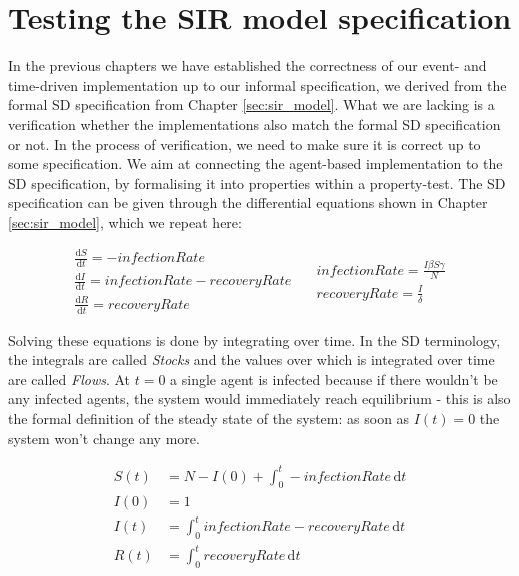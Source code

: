 \chapter{Testing the SIR model specification}
\label{ch:prop_sirspec}

In the previous chapters we have established the correctness of our event- and time-driven implementation up to our informal specification, we derived from the formal SD specification from Chapter \ref{sec:sir_model}. What we are lacking is a verification whether the implementations also match the formal SD specification or not. In the process of verification, we need to make sure it is correct up to some specification. We aim at connecting the agent-based implementation to the SD specification, by formalising it into properties within a property-test. The SD specification can be given through the differential equations shown in Chapter \ref{sec:sir_model}, which we repeat here:

\begin{equation}
\begin{split}
\frac{\mathrm d S}{\mathrm d t} = -infectionRate \\
\frac{\mathrm d I}{\mathrm d t} = infectionRate - recoveryRate \\
\frac{\mathrm d R}{\mathrm d t} = recoveryRate 
\end{split}
\quad
\begin{split}
infectionRate = \frac{I \beta S \gamma}{N} \\
recoveryRate = \frac{I}{\delta} 
\end{split}
\end{equation}
\label{eq:sir_delta_rates}

Solving these equations is done by integrating over time. In the SD terminology, the integrals are called \textit{Stocks} and the values over which is integrated over time are called \textit{Flows}. At $t = 0$ a single agent is infected because if there wouldn't be any infected agents, the system would immediately reach equilibrium - this is also the formal definition of the steady state of the system: as soon as $I(t) = 0$ the system won't change any more.

\begin{align}
S(t) &= N - I(0) + \int_0^t -infectionRate\, \mathrm{d}t \\
I(0) &= 1 \\
I(t) &= \int_0^t infectionRate - recoveryRate\, \mathrm{d}t \\
R(t) &= \int_0^t recoveryRate\, \mathrm{d}t
\end{align}

